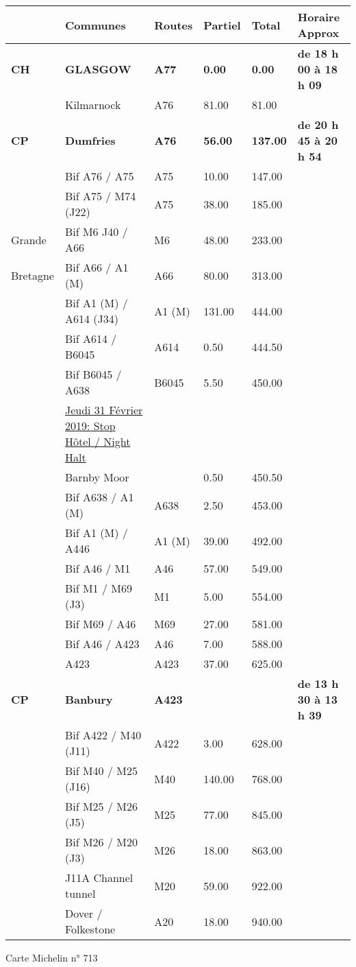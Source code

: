 \documentclass{article}%
\begin{document}
\begin{longtable}{p{2.25cm}|p{7.0cm}|p{1.5cm}|p{1.5cm}|p{1.5cm}|p{3.5cm}}%
\hline%
&Communes&Routes&Partiel&Total&Horaire Approx\\%
\hline%
\endhead%
\endfoot%
\endlastfoot%
\textbf{﻿CH}&\textbf{GLASGOW}&\textbf{A77}&\textbf{0.00}&\textbf{0.00}&\textbf{de 18 h 00 à 18 h 09}\\%
 &Kilmarnock&A76&81.00&81.00& \\%
\textbf{CP}&\textbf{Dumfries}&\textbf{A76}&\textbf{56.00}&\textbf{137.00}&\textbf{de 20 h 45 à 20 h 54 }\\%
 &Bif A76 / A75&A75&10.00&147.00& \\%
 &Bif A75  / M74 (J22)&A75&38.00&185.00& \\%
Grande  &Bif M6 J40 / A66&M6&48.00&233.00& \\%
Bretagne&Bif A66 / A1 (M)&A66&80.00&313.00& \\%
 &Bif A1 (M) / A614 (J34)&A1 (M)&131.00&444.00& \\%
 &Bif A614 / B6045&A614&0.50&444.50& \\%
 &Bif B6045 / A638&B6045&5.50&450.00& \\%
 &\underline{Jeudi 31 Février 2019: Stop Hôtel / Night Halt}& & & & \\%
 &Barnby Moor & &0.50&450.50& \\%
 &Bif A638 / A1 (M)&A638&2.50&453.00& \\%
 &Bif A1 (M) / A446&A1 (M)&39.00&492.00& \\%
 &Bif A46 / M1&A46&57.00&549.00& \\%
 &Bif M1 / M69 (J3)&M1&5.00&554.00& \\%
 &Bif M69 / A46&M69&27.00&581.00& \\%
 &Bif A46 / A423&A46&7.00&588.00& \\%
 &A423&A423&37.00&625.00& \\%
\textbf{CP}&\textbf{Banbury}&\textbf{A423}& & &\textbf{de 13 h 30 à 13 h 39 }\\%
 &Bif A422 / M40 (J11)&A422&3.00&628.00& \\%
 &Bif M40 / M25 (J16)&M40&140.00&768.00& \\%
 &Bif M25 / M26 (J5) &M25&77.00&845.00& \\%
 &Bif M26 / M20 (J3)&M26&18.00&863.00& \\%
 &J11A Channel tunnel&M20&59.00&922.00& \\%
 &Dover / Folkestone               &A20&18.00&940.00& \\%
\hline%
\end{longtable}%
\begin{flushleft} Carte Michelin n° 713
 \end{flushleft}%
\end{document}
